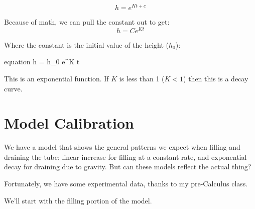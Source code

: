 \documentclass[11pt,fleqn]{book}
\begin{document}
	\begin{equation}
		h = e^{K t + c}
	\end{equation}
	
	Because of math, we can pull the constant out to get:
	\begin{equation}
		h = Ce^{K t}
	\end{equation}
	
	Where the constant is the initial value of the height ($h_0$):
	\begin{empheq}[]{equation}
		\label{analyticalDraining}
		h = h_0 \cdot e^{K t}
	\end{empheq}
	
	This is an exponential function. If $K$ is less than 1 ($K<1$) then this is a decay curve.
	
	
\chapter{Model Calibration}
	
	We have a model that shows the general patterns we expect when filling and draining the tube: linear increase for filling at a constant rate, and exponential decay for draining due to gravity. But can these models reflect the actual thing?
	
	Fortunately, we have some experimental data, thanks to my pre-Calculus class. 
	
	We'll start with the filling portion of the model.
	
\end{document}
